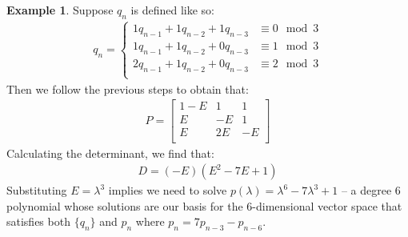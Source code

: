 \documentclass[a4paper]{article}
\theoremstyle{definition}
\newtheorem{example}{Example}[section]
\begin{document}
\begin{example}
Suppose $q_n$ is defined like so:
\begin{align*}
q_n=
\begin{cases}
1q_{n-1}+1q_{n-2}+1q_{n-3} & \equiv 0 \mod 3 \\
1q_{n-1}+1q_{n-2}+0q_{n-3} & \equiv 1 \mod 3 \\
2q_{n-1}+1q_{n-2}+0q_{n-3} & \equiv 2 \mod 3 \\
\end{cases}
\end{align*}
Then we follow the previous steps to obtain that:
\begin{align*}
P=
\begin{bmatrix}
    1-E & 1  & 1  \\
    E   & -E & 1  \\
    E   & 2E & -E \\
\end{bmatrix}
\end{align*}
Calculating the determinant, we find that:
\begin{align*}
D=(-E)(E^2-7E+1)
\end{align*}
Substituting $E=\lambda^3$ implies we need to solve $p(\lambda)=\lambda^6-7\lambda^3+1$ -- a degree 6 polynomial whose solutions are our basis for the 6-dimensional vector space that satisfies both $\{q_n\}$ and ${p_n}$ where $p_n=7p_{n-3}-p_{n-6}$.
\end{example}
\end{document}
